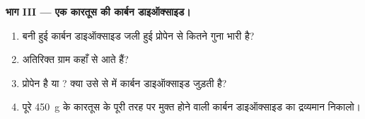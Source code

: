 \begin{problem}
\medskip
\noindent\textbf{भाग III --- एक कारतूस की कार्बन डाइऑक्साइड।}
\begin{enumerate}[resume]
  \item बनी हुई कार्बन डाइऑक्साइड जली हुई प्रोपेन से कितने गुना भारी
        है?
  \item अतिरिक्त ग्राम कहाँ से आते हैं?
  \item प्रोपेन  है या ? क्या उसे  से  में
        कार्बन डाइऑक्साइड जुड़ती है?
  \item पूरे \qty{450}{g} के कारतूस के पूरी तरह  पर मुक्त होने वाली कार्बन
        डाइऑक्साइड का द्रव्यमान निकालो।
\end{enumerate}
\end{problem}
